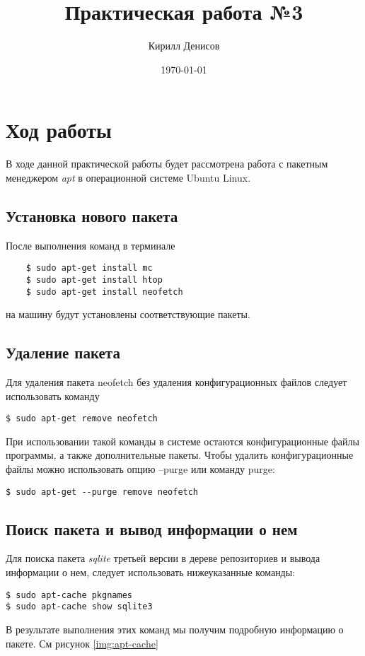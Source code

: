 \documentclass[a4paper,14pt]{extarticle}
\author{Кирилл Денисов}
\title{Практическая работа №3}
\date{\today}
\newcommand{\pathToCommonFolder}{/home/denilai/Desktop/LaTeX/Common}
\begin{document}
	\thispagestyle{empty}
	
	
	
	\newpage
	\tableofcontents
	\newpage

\section{Ход работы}
В ходе данной практической работы будет рассмотрена работа с пакетным менеджером \textit{apt} в операционной системе Ubuntu Linux.
\subsection{Установка нового пакета}
После выполнения команд в терминале
\begin{lstlisting}
	$ sudo apt-get install mc
	$ sudo apt-get install htop
	$ sudo apt-get install neofetch
\end{lstlisting}
на машину будут установлены соответствующие пакеты.
\subsection{Удаление пакета}
Для удаления пакета neofetch без удаления конфигурационных файлов следует использовать команду 
\begin{lstlisting}
$ sudo apt-get remove neofetch
\end{lstlisting}

При использовании такой команды в системе остаются конфигурационные файлы программы, а также дополнительные пакеты. Чтобы удалить конфигурационные файлы можно использовать опцию --purge или команду purge:
\begin{lstlisting}
$ sudo apt-get --purge remove neofetch
\end{lstlisting}
\subsection{ Поиск пакета и вывод информации о нем}
Для поиска пакета \textit{sqlite} третьей версии в дереве репозиториев и вывода информации о нем, следует использовать нижеуказанные команды:
\begin{lstlisting}
$ sudo apt-cache pkgnames 
$ sudo apt-cache show sqlite3
\end{lstlisting}

В результате выполнения этих команд мы получим подробную информацию о пакете. См рисунок \ref{img:apt-cache}
\end{document}
